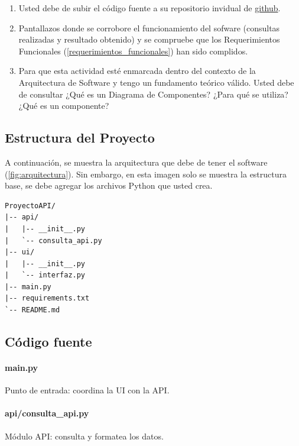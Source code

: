 \documentclass[12pt]{article}
\begin{document}
\begin{enumerate}
    \item Usted debe de subir el código fuente a su repositorio invidual de  \href{https://github.com/}{github}. 
    
    \item Pantallazos donde se corrobore el funcionamiento del sofware (consultas realizadas y resultado obtenido) y se compruebe que los Requerimientos Funcionales (\autoref{requerimientos_funcionales}) han sido complidos.
    
    \item Para que esta actividad esté enmarcada dentro del contexto de la Arquitectura de Software y tengo un fundamento teórico válido. Usted debe de consultar ¿Qué es un Diagrama de Componentes? ¿Para qué se utiliza? ¿Qué es un componente?
\end{enumerate}

\subsection{Estructura del Proyecto}

A continuación, se muestra la arquitectura que debe de tener el software (\autoref{fig:arquitectura}). Sin embargo, en esta imagen solo se muestra la estructura base, se debe agregar los archivos Python que usted crea.


\begin{lstlisting}[numbers=none]
ProyectoAPI/
|-- api/
|   |-- __init__.py
|   `-- consulta_api.py
|-- ui/
|   |-- __init__.py
|   `-- interfaz.py
|-- main.py
|-- requirements.txt
`-- README.md
\end{lstlisting}


\subsection{Código fuente}

\paragraph{main.py} Punto de entrada: coordina la UI con la API.


\paragraph{api/consulta\_api.py} Módulo API: consulta y formatea los datos.

\end{document}
